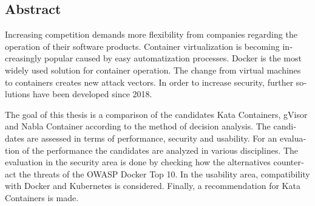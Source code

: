 

\begin{otherlanguage}{american}
	\chapter*{Abstract}
	Increasing competition demands more flexibility from companies regarding the operation of their software products. Container virtualization is becoming increasingly popular caused by easy automatization processes. Docker is the most widely used solution for container operation. The change from virtual machines to containers creates new attack vectors. In order to increase security, further solutions have been developed since 2018.
	
	The goal of this thesis is a comparison of the candidates Kata Containers, gVisor and Nabla Container according to the method of decision analysis. The candidates are assessed in terms of performance, security and usability. For an evaluation of the performance the candidates are analyzed in various disciplines. The evaluation in the security area is done by checking how the alternatives counteract the threats of the OWASP Docker Top 10. In the usability area, compatibility with Docker and Kubernetes is considered. Finally, a recommendation for Kata Containers is made.

\end{otherlanguage}